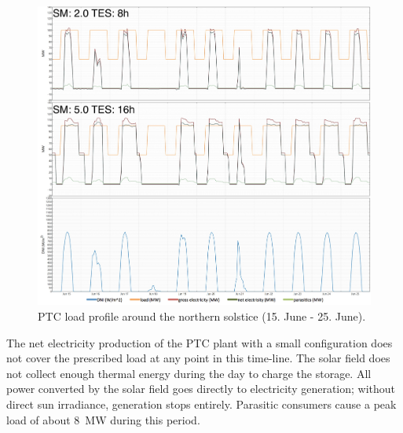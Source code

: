 \begin{figure}[htbp]  
\centering
\includegraphics[width=1\linewidth]{FIG/PTC_winter_load}
\caption[PTC load profile around the northern solstice (15. June - 25. June).]{PTC load profile around the northern solstice (15. June - 25. June).}\label{PTC_winter_load}
\end{figure}

The net electricity production of the PTC plant with a small configuration does not cover the prescribed load at any point in this time-line. The solar field does not collect enough thermal energy during the day to charge the storage. All power converted by the solar field goes directly to electricity generation; without direct sun irradiance, generation stops entirely. Parasitic consumers cause a peak load of about \SI{8}{MW} during this period.


